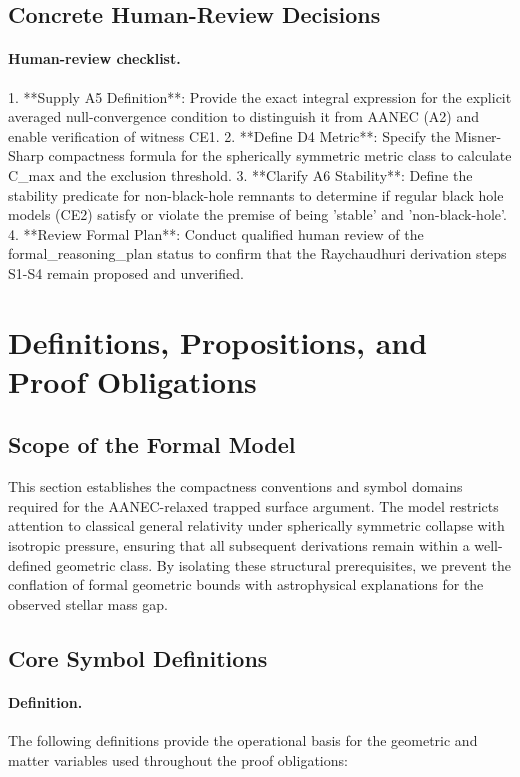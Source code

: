 \documentclass[conference]{IEEEtran}
\begin{document}
\subsection{Concrete Human-Review Decisions}
\paragraph{Human-review checklist.} 1. **Supply A5 Definition**: Provide the exact integral expression for the explicit averaged null-convergence condition to distinguish it from AANEC (A2) and enable verification of witness CE1. 2. **Define D4 Metric**: Specify the Misner-Sharp compactness formula for the spherically symmetric metric class to calculate C\_max and the exclusion threshold. 3. **Clarify A6 Stability**: Define the stability predicate for non-black-hole remnants to determine if regular black hole models (CE2) satisfy or violate the premise of being 'stable' and 'non-black-hole'. 4. **Review Formal Plan**: Conduct qualified human review of the formal\_reasoning\_plan status to confirm that the Raychaudhuri derivation steps S1-S4 remain proposed and unverified.

\section{Definitions, Propositions, and Proof Obligations}
\subsection{Scope of the Formal Model}
This section establishes the compactness conventions and symbol domains required for the AANEC-relaxed trapped surface argument. The model restricts attention to classical general relativity under spherically symmetric collapse with isotropic pressure, ensuring that all subsequent derivations remain within a well-defined geometric class. By isolating these structural prerequisites, we prevent the conflation of formal geometric bounds with astrophysical explanations for the observed stellar mass gap.

\subsection{Core Symbol Definitions}
\paragraph{Definition.} The following definitions provide the operational basis for the geometric and matter variables used throughout the proof obligations:
\end{document}
